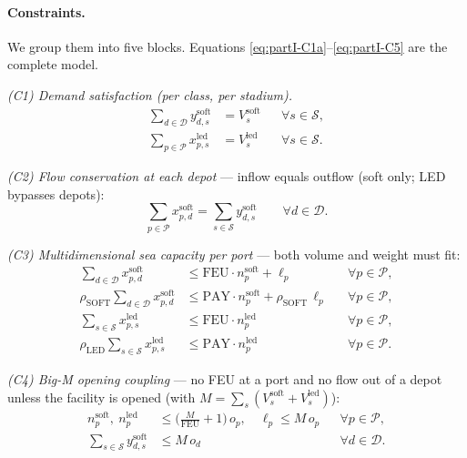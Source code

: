 \documentclass[11pt,a4paper]{article}
\numberwithin{equation}{section}
\begin{document}
\paragraph{Constraints.} We group them into five blocks. Equations \eqref{eq:partI-C1a}--\eqref{eq:partI-C5} are the complete model.

\textit{(C1) Demand satisfaction (per class, per stadium).}
\begin{align}
\sum_{d \in \mathcal{D}} y^{\mathrm{soft}}_{d,s} &= V^{\mathrm{soft}}_s &&\forall s \in \mathcal{S}, \label{eq:partI-C1a}\\
\sum_{p \in \mathcal{P}} x^{\mathrm{led}}_{p,s} &= V^{\mathrm{led}}_s &&\forall s \in \mathcal{S}. \label{eq:partI-C1b}
\end{align}

\textit{(C2) Flow conservation at each depot} — inflow equals outflow (soft only; LED bypasses depots):
\begin{equation}
\sum_{p \in \mathcal{P}} x^{\mathrm{soft}}_{p,d} = \sum_{s \in \mathcal{S}} y^{\mathrm{soft}}_{d,s} \qquad \forall d \in \mathcal{D}. \label{eq:partI-C2}
\end{equation}

\textit{(C3) Multidimensional sea capacity per port} — both volume and weight must fit:
\begin{align}
\sum_{d \in \mathcal{D}} x^{\mathrm{soft}}_{p,d} &\le \mathrm{FEU}\cdot n^{\mathrm{soft}}_p + \ell_p && \forall p \in \mathcal{P}, \label{eq:partI-C3a}\\
\rho_{\mathrm{SOFT}}\!\sum_{d \in \mathcal{D}} x^{\mathrm{soft}}_{p,d} &\le \mathrm{PAY}\cdot n^{\mathrm{soft}}_p + \rho_{\mathrm{SOFT}}\,\ell_p && \forall p \in \mathcal{P}, \label{eq:partI-C3b}\\
\sum_{s \in \mathcal{S}} x^{\mathrm{led}}_{p,s} &\le \mathrm{FEU}\cdot n^{\mathrm{led}}_p && \forall p \in \mathcal{P}, \label{eq:partI-C3c}\\
\rho_{\mathrm{LED}}\!\sum_{s \in \mathcal{S}} x^{\mathrm{led}}_{p,s} &\le \mathrm{PAY}\cdot n^{\mathrm{led}}_p && \forall p \in \mathcal{P}. \label{eq:partI-C3d}
\end{align}

\textit{(C4) Big-M opening coupling} — no FEU at a port and no flow out of a depot unless the facility is opened (with $M = \sum_s (V^{\mathrm{soft}}_s + V^{\mathrm{led}}_s)$):
\begin{align}
n^{\mathrm{soft}}_p,\ n^{\mathrm{led}}_p &\le \Big(\tfrac{M}{\mathrm{FEU}}+1\Big)\, o_p, \quad \ell_p \le M\, o_p && \forall p \in \mathcal{P},\label{eq:partI-C4a}\\
\sum_{s \in \mathcal{S}} y^{\mathrm{soft}}_{d,s} &\le M\, o_d && \forall d \in \mathcal{D}.\label{eq:partI-C4b}
\end{align}
\end{document}
